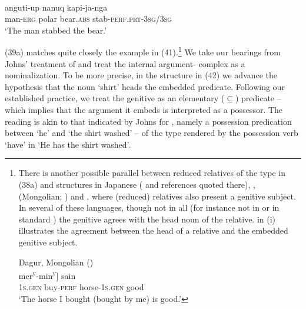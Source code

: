 \documentclass[output=paper]{langsci/langscibook}
\begin{document}
\ea%
          \citep[61]{Johns1992}\label{ex:manzini:41}\\
    \gll anguti-up   nanuq     kapi-ja-nga\\
         man-\textsc{erg}   {polar bear.\textsc{abs}}  stab-\textsc{perf.prt-3sg/3sg}\\
    \glt ‘The man stabbed the bear.’
\z

 (39a) matches quite closely the  example in (41).\footnote{There is another possible parallel between reduced relatives of the type in (38a) and structures in Japanese (\citealt{Miyagawa2011} and references quoted there),  \citep{Kornfilt2008},  (Mongolian; \citealt{Hale2002}) and  \citep{Herd2011}, where (reduced) relatives also present a genitive subject. In several of these languages, though not in all (for instance not in  or in standard ) the genitive agrees with the head noun of the relative.  in (i) illustrates the agreement between the head of a relative and the embedded genitive subject.

\ea         Dagur, Mongolian (\citealt[109-110]{Hale2002})\\
    \gll    [[mini   au-sen]         
            mer\textsuperscript{y}{}-min\textsuperscript{y}]   sain\\   \textsc{1s.gen}  buy-\textsc{perf}  horse-\textsc{1s.gen}  good\\
    \glt    ‘The horse I bought (bought by me) is good.’
\z
}  We take our bearings from Johns’ treatment of  and treat the internal argument- complex as a nominalization. To be more precise, in the structure in (42) we advance the hypothesis that the noun ‘shirt’ heads the embedded predicate. Following our established practice, we treat the genitive as an elementary ($\subseteq$) predicate – which implies that the argument it embeds is interpreted as a possessor. The reading is akin to that indicated by Johns for , namely a possession predication between ‘he’ and ‘the shirt washed’ – of the type rendered by the possession verb ‘have’ in  ‘He has the shirt washed’.\largerpage[2] 
\end{document}
